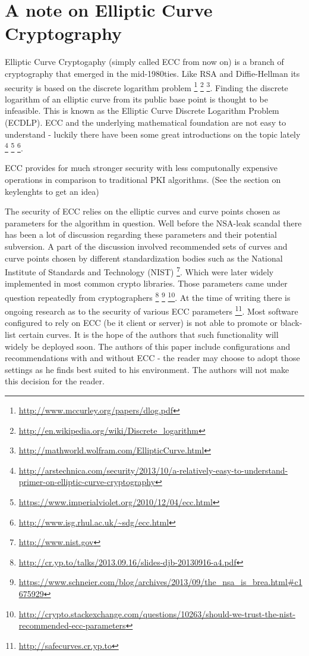 \section{A note on Elliptic Curve Cryptography}

Elliptic Curve Cryptogaphy (simply called ECC from now on) is a branch of 
cryptography that emerged in the mid-1980ties. Like RSA and Diffie-Hellman 
its security is based on the discrete logarithm problem
\footnote{\url{http://www.mccurley.org/papers/dlog.pdf}} 
\footnote{\url{http://en.wikipedia.org/wiki/Discrete\_logarithm}}
\footnote{\url{http://mathworld.wolfram.com/EllipticCurve.html}}.
Finding the discrete logarithm of an elliptic curve from its public base
point is thought to be infeasible. This is known as the Elliptic Curve Discrete 
Logarithm Problem (ECDLP). ECC and the underlying mathematical foundation are not easy 
to understand - luckily there have been some great introductions on the topic lately
\footnote{\url{http://arstechnica.com/security/2013/10/a-relatively-easy-to-understand-primer-on-elliptic-curve-cryptography}}
\footnote{\url{https://www.imperialviolet.org/2010/12/04/ecc.html}}
\footnote{\url{http://www.isg.rhul.ac.uk/~sdg/ecc.html}}.

ECC provides for much stronger security with less computonally expensive
operations in comparison to traditional PKI algorithms. (See the section 
on keylenghts to get an idea)


The security of ECC relies on the elliptic curves and curve points chosen
as parameters for the algorithm in question. Well before the NSA-leak scandal
there has been a lot of discussion regarding these parameters and their 
potential subversion. A part of the discussion involved recommended sets 
of curves and curve points chosen by different standardization bodies such 
as the National Institute of Standards and Technology (NIST) 
\footnote{\url{http://www.nist.gov}}. Which were later widely implemented 
in most common crypto libraries. Those parameters came under question 
repeatedly from cryptographers
\footnote{\url{http://cr.yp.to/talks/2013.09.16/slides-djb-20130916-a4.pdf}}
\footnote{\url{https://www.schneier.com/blog/archives/2013/09/the\_nsa\_is\_brea.html\#c1675929}}
\footnote{\url{http://crypto.stackexchange.com/questions/10263/should-we-trust-the-nist-recommended-ecc-parameters}}.
At the time of writing there is ongoing research as to the security of 
various ECC parameters
\footnote{\url{http://safecurves.cr.yp.to}}. 
Most software configured to rely on ECC (be it client or server) is
not able to promote or black-list certain curves. It is the hope of
the authors that such functionality will widely be deployed soon.
The authors of this paper include configurations and recommendations
with and without ECC - the reader may choose to adopt those settings
as he finds best suited to his environment. The authors will not make
this decision for the reader.



